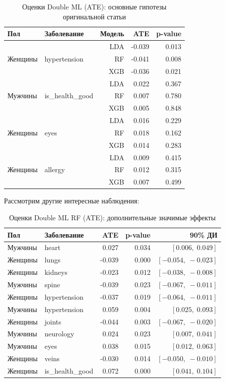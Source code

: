 \documentclass[a4paper,12pt]{article}
\begin{document}
\begin{table}[H]
\centering
\caption{Оценки Double ML (ATE): основные гипотезы оригинальной статьи}
\begin{tabular}{@{}llrrr@{}}
\toprule
\textbf{Пол} & \textbf{Заболевание} & \textbf{Модель} & \textbf{ATE} & \textbf{p-value} \\
\midrule
\multirow{3}{*}{Женщины} & \multirow{3}{*}{hypertension}
  & LDA & -0.039 & 0.013 \\
& & RF  & -0.041 & 0.008 \\
& & XGB & -0.036 & 0.021 \\
\midrule
\multirow{3}{*}{Мужчины} & \multirow{3}{*}{is\_health\_good}
  & LDA &  0.022 & 0.367 \\
& & RF  &  0.007 & 0.780 \\
& & XGB &  0.005 & 0.848 \\
\midrule
\multirow{3}{*}{Женщины} & \multirow{3}{*}{eyes}
  & LDA &  0.016 & 0.229 \\
& & RF  &  0.018 & 0.162 \\
& & XGB &  0.014 & 0.283 \\
\midrule
\multirow{3}{*}{Женщины} & \multirow{3}{*}{allergy}
  & LDA &  0.009 & 0.415 \\
& & RF  &  0.012 & 0.315 \\
& & XGB &  0.007 & 0.499 \\
\bottomrule
\end{tabular}
\end{table}

Рассмотрим другие интересные наблюдения:
\begin{table}[H]
\centering
\caption{Оценки Double ML RF (ATE): дополнительные значимые эффекты}
\begin{tabular}{@{}llrrr@{}}
\toprule
\textbf{Пол} & \textbf{Заболевание} & \textbf{ATE} & \textbf{p-value} & \textbf{90\% ДИ} \\
\midrule
Мужчины & heart           &  0.027 & 0.034 & $[0.006,\; 0.049]$ \\
Женщины & lungs           & -0.039 & 0.000 & $[-0.054,\; -0.023]$ \\
Женщины & kidneys         & -0.023 & 0.012 & $[-0.038,\; -0.008]$ \\
Мужчины & spine           & -0.039 & 0.023 & $[-0.067,\; -0.011]$ \\
Женщины & hypertension    & -0.037 & 0.019 & $[-0.064,\; -0.011]$ \\
Мужчины & hypertension    &  0.059 & 0.004 & $[0.025,\; 0.093]$ \\
Женщины & joints          & -0.044 & 0.003 & $[-0.067,\; -0.020]$ \\
Мужчины & neurology       &  0.024 & 0.023 & $[0.007,\; 0.041]$ \\
Мужчины & eyes            &  0.038 & 0.015 & $[0.012,\; 0.063]$ \\
Женщины & veins           & -0.030 & 0.014 & $[-0.050,\; -0.010]$ \\
Женщины & is\_health\_good &  0.072 & 0.000 & $[0.041,\; 0.104]$ \\
\bottomrule
\end{tabular}
\end{table}
\end{document}
